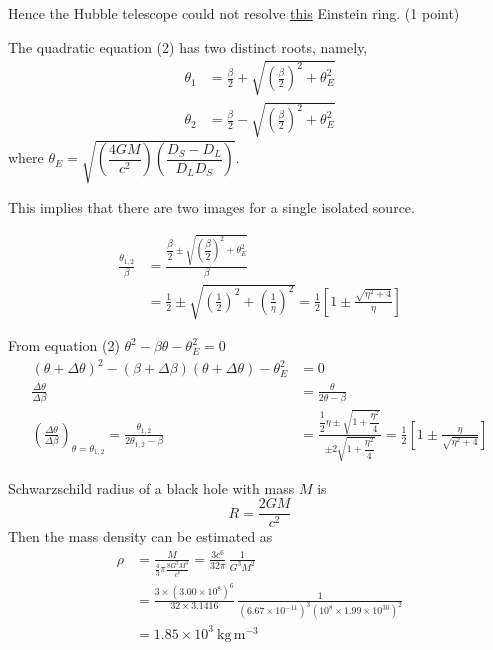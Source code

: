\begin{description}
Hence the Hubble telescope could not resolve \underline{this} Einstein ring.
\hfill(1 point)

\item[d).] The quadratic equation (2) has two distinct roots, namely,
\begin{align*}
\theta_1 &= \frac{\beta}{2}
  + \sqrt{\left(\frac{\beta}{2}\right)^2 + \theta_E^2} \tag*{(1 point)}\\
\theta_2 &= \frac{\beta}{2}
  - \sqrt{\left(\frac{\beta}{2}\right)^2 + \theta_E^2} \tag*{(1 point)}
\end{align*}
where $\theta_E = \sqrt{\left(\dfrac{4GM}{c^2}\right)
\left(\dfrac{D_S - D_L}{D_L D_S}\right)}$.

This implies that there are two images for a single isolated source.

\item[e).]
\begin{align*}
\frac{\theta_{1,2}}{\beta}
  &= \frac{\dfrac{\beta}{2}
       \pm \sqrt{\left(\dfrac{\beta}{2}\right)^2 + \theta_E^2}}{\beta}\\
  &= \frac{1}{2}
     \pm \sqrt{\left(\frac{1}{2}\right)^2 + \left(\frac{1}{\eta}\right)^2}
   = \frac{1}{2}\left[1 \pm \frac{\sqrt{\eta^2 + 4}}{\eta}\right]
  \tag*{(1 point)}
\end{align*}

\item[f).] From equation (2) $\theta^2 - \beta\theta - \theta_E^2 = 0$
\begin{align*}
\left(\theta + \Delta\theta\right)^2
  - \left(\beta + \Delta\beta\right)\left(\theta + \Delta\theta\right)
  - \theta_E^2 &= 0\\
\frac{\Delta\theta}{\Delta\beta}
  &= \frac{\theta}{2\theta - \beta} \tag*{(1 point)}\\
\left(\frac{\Delta\theta}{\Delta\beta}\right)_{\theta=\theta_{1,2}}
  = \frac{\theta_{1,2}}{2\theta_{1,2} - \beta}
  &= \frac{\dfrac{1}{2}\eta \pm \sqrt{1 + \dfrac{\eta^2}{4}}}
          {\pm 2\sqrt{1 + \dfrac{\eta^2}{4}}}
   = \frac{1}{2}\left[1 \pm \frac{\eta}{\sqrt{\eta^2 + 4}}\right]
  \tag*{(1 point)}
\end{align*}
\end{description}

Schwarzschild radius of a black hole with mass $M$ is
\[
R = \frac{2GM}{c^2} \tag*{(4 points)}
\]
Then the mass density can be estimated as
\begin{align*}
\rho &= \frac{M}{\frac{4}{3}\pi \frac{8G^3M^3}{c^6}}
      = \frac{3c^6}{32\pi}\,\frac{1}{G^3M^2} \tag*{(2 points)}\\
     &= \frac{3 \times (3.00 \times 10^{8})^6}{32 \times 3.1416}\,
        \frac{1}{(6.67 \times 10^{-11})^3 (10^{8} \times 1.99 \times 10^{30})^2}\\
     &= 1.85 \times 10^{3}~\mathrm{kg\,m^{-3}} \tag*{(4 points)}
\end{align*}

